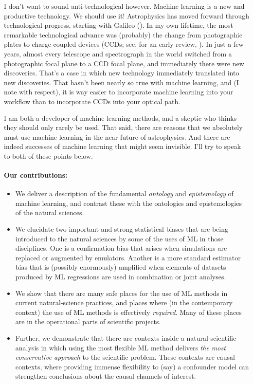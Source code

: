 \documentclass[11pt]{article}
\begin{document}
I don't want to sound anti-technological however.
Machine learning is a new and productive technology.
We should use it!
Astrophysics has moved forward through technological progress, starting with Galileo (\cite{galileo}).
In my own lifetime, the most remarkable technological advance was (probably) the change from photographic plates to charge-coupled devices (CCDs; see, for an early review, \cite{ccd}).
In just a few years, almost every telescope and spectrograph in the world switched from a photographic focal plane to a CCD focal plane, and immediately there were new discoveries.
That's a case in which new technology immediately translated into new discoveries.
That hasn't been nearly so true with machine learning, and (I note with respect), it is way easier to incorporate machine learning into your workflow than to incorporate CCDs into your optical path.

I am both a developer of machine-learning methods, and a skeptic who thinks they should only rarely be used.
That said, there are reasons that we absolutely must use machine learning in the near future of astrophysics.
And there are indeed successes of machine learning that might seem invisible.
I'll try to speak to both of these points below.

\paragraph{Our contributions:}
\begin{itemize}
  \item We deliver a description of the fundamental \emph{ontology} and \emph{epistemology} of machine learning, and contrast these with the ontologies and epistemologies of the natural sciences.
  \item We elucidate two important and strong statistical biases that are being introduced to the natural sciences by some of the uses of ML in those disciplines. One is a confirmation bias that arises when simulations are replaced or augmented by emulators. Another is a more standard estimator bias that is (possibly enormously) amplified when elements of datasets produced by ML regressions are used in combination or joint analyses.
  \item We show that there are many safe places for the use of ML methods in current natural-science practices, and places where (in the contemporary context) the use of ML methods is effectively \emph{required}. Many of these places are in the operational parts of scientific projects.
  \item Further, we demonstrate that there are contexts inside a natural-scientific analysis in which using the most flexible ML method delivers \emph{the most conservative approach} to the scientific problem. These contexts are causal contexts, where providing immense flexibility to (say) a confounder model can strengthen conclusions about the causal channels of interest.
\end{itemize}
\end{document}
